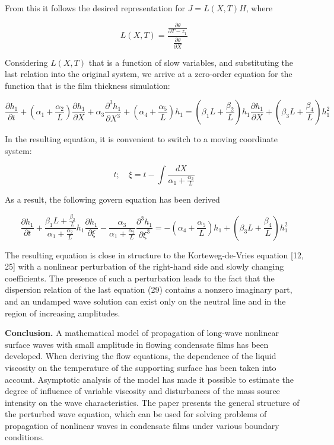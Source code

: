 From this it follows the desired representation for $J=L(X,T)H$, where

\begin{equation}
L(X, T) = \frac{\frac{\partial \theta}{\partial T - z_1}}{\frac{\partial \theta}{\partial X}}
\end{equation}

Considering $L(X,T)$ that is a function of slow variables, and
substituting the last relation into the original system, we arrive at
a zero-order equation for the function that is the film thickness
simulation:

\begin{equation}
\frac{\partial h_1}{\partial t}
+ \left( \alpha_1 + \frac{\alpha_2}{L} \right) \frac{\partial h_1}{\partial X}
+ \alpha_3 \frac{\partial^3 h_1}{\partial X^3}
+ \left( \alpha_4 + \frac{\alpha_5}{L} \right) h_1
=
\left( \beta_1 L + \frac{\beta_2}{L} \right) h_1 \frac{\partial h_1}{\partial X}
+ \left( \beta_3 L + \frac{\beta_4}{L} \right) h_1^2
\end{equation}

In the resulting equation, it is convenient to switch to a moving
coordinate system:

\begin{equation}
t; \quad \xi = t - \int \frac{dX}{\alpha_1 + \frac{\alpha_2}{L}}
\end{equation}

As a result, the following govern equation has been derived

\begin{equation}
\frac{\partial h_1}{\partial t}
+ \frac{\beta_1 L + \frac{\beta_2}{L}}{\alpha_1 + \frac{\alpha_2}{L}} h_1 \frac{\partial h_1}{\partial \xi}
- \frac{\alpha_3}{\alpha_1 + \frac{\alpha_2}{L}} \frac{\partial^3 h_1}{\partial \xi^3}
=
- \left( \alpha_4 + \frac{\alpha_5}{L} \right) h_1
+ \left( \beta_3 L + \frac{\beta_4}{L} \right) h_1^2
\end{equation}

\begin{multicols}{2}
The resulting equation is close in structure to the Korteweg-de-Vries
equation {[}12, 25{]} with a nonlinear perturbation of the right-hand
side and slowly changing coefficients. The presence of such a
perturbation leads to the fact that the dispersion relation of the last
equation (29) contains a nonzero imaginary part, and an undamped wave
solution can exist only on the neutral line and in the region of
increasing amplitudes.

{\bfseries Conclusion.} A mathematical model of propagation of long-wave
nonlinear surface waves with small amplitude in flowing condensate films
has been developed. When deriving the flow equations, the dependence of
the liquid viscosity on the temperature of the supporting surface has
been taken into account. Asymptotic analysis of the model has made it
possible to estimate the degree of influence of variable viscosity and
disturbances of the mass source intensity on the wave characteristics.
The paper presents the general structure of the perturbed wave equation,
which can be used for solving problems of propagation of nonlinear waves
in condensate films under various boundary conditions.
\end{multicols}

